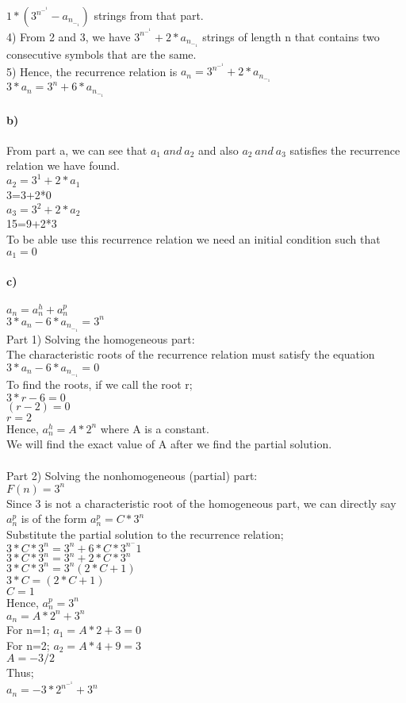 \documentclass[11pt]{article}
\begin{document}
$1*(3^n^-^1 - a_n_-_1)$
strings from that part. \\
4) From 2 and 3, we have
$3^n^-^1 +2*a_n_-_1$
strings of length n that contains two consecutive symbols that are the same.\\
5) Hence, the recurrence relation is
$a_n=3^n^-^1 +2*a_n_-_1$\\
$3*a_n=3^n +6*a_n_-_1$
 
\paragraph{\textbf{b)}}
From part a, we can see that 
$a_1 \ and \ a_2 $
and also 
$a_2 \ and \ a_3$
satisfies the recurrence relation we have found. \\
$a_2=3^1 + 2*a_1$\\
3=3+2*0\\
$a_3=3^2 + 2*a_2$\\
15=9+2*3\\
To be able use this recurrence relation we need an initial condition such that
$a_1=0$

\paragraph{\textbf{c)}}
$a_n=a_n^h+a_n^p$\\
$3*a_n-6*a_n_-_1=3^n$\\
Part 1) Solving the homogeneous part: \\
The characteristic roots of the recurrence relation must satisfy the equation
$3*a_n-6*a_n_-_1=0$\\
To find the roots, if we call the root r;\\
$3*r-6=0$\\
$(r-2)=0$\\
$ r=2$\\
Hence,
$a_n^h=A*2^n$
where A is a constant.\\
We will find the exact value of A after we find the partial solution.\\\\
Part 2) Solving the nonhomogeneous (partial) part: \\
$F(n)=3^n$ \\
Since 3 is not a characteristic root of the homogeneous part, we can directly say
$a_n^p$
is of the form 
$a_n^p=C*3^n$\\
Substitute the partial solution to the recurrence relation;\\
$3*C*3^n=3^n+6*C*3^n^-1$\\
$3*C*3^n=3^n+2*C*3^n$\\
$3*C*3^n=3^n(2*C+1)$\\
$3*C=(2*C+1)$\\
$C=1$\\
Hence,
$a_n^p=3^n$\\
$a_n=A*2^n+3^n$\\
For n=1;
$a_1=A*2+3=0$\\
For n=2;
$a_2=A*4+9=3$\\
$A=-3/2$\\
Thus;\\
$a_n=-3*2^n^-^1+3^n$
\end{document}
